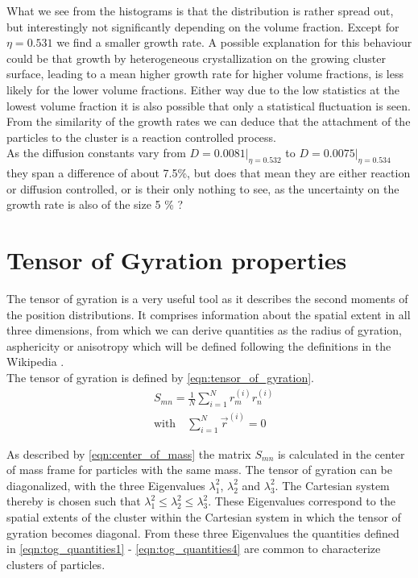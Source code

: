 What we see from the histograms is that the distribution is rather spread out, but interestingly not significantly depending on the volume fraction. Except for $\eta = 0.531$ we find a smaller growth rate. A possible explanation for this behaviour could be that growth by heterogeneous crystallization on the growing cluster surface, leading to a mean higher growth rate for higher volume fractions, is less likely for the lower volume fractions. Either way due to the low statistics at the lowest volume fraction it is also possible that only a statistical fluctuation is seen. From the similarity of the growth rates we can deduce that the attachment of the particles to the cluster is a reaction controlled process.  \\

As the diffusion constants vary from $D=0.0081|_{\eta = 0.532}$ to $D=0.0075|_{\eta = 0.534}$ they span a difference of about 7.5\%, but does that mean they are either reaction or diffusion controlled, or is their only nothing to see, as the uncertainty on the growth rate is also of the size 5 \% ?

\section{Tensor of Gyration properties}
\label{sec:tog}
The tensor of gyration is a very useful tool as it describes the second moments of the position distributions. It comprises information about the spatial extent in all three dimensions, from which we can derive quantities as the radius of gyration, asphericity or anisotropy which will be defined following the definitions in the Wikipedia .\\

The tensor of gyration is defined by \autoref{eqn:tensor_of_gyration}.
\begin{align}
\label{eqn:tensor_of_gyration}
&S_{mn}=\frac{1}{N} \sum_{i=1}^{N} r^{(i)}_m r^{(i)}_n\\
\label{eqn:center_of_mass}
&\text{with} \quad \sum_{i=1}^{N} \vec{r}^{(i)} = 0
\end{align}

As described by \autoref{eqn:center_of_mass} the matrix $S_{mn}$ is calculated in the center of mass frame for particles with the same mass. The tensor of gyration can be diagonalized, with the three Eigenvalues $\lambda_1^2$, $\lambda_2^2$ and $\lambda_3^2$. The Cartesian system thereby is chosen such that $\lambda_1^2 \leq \lambda_2^2 \leq \lambda_3^2 $. These Eigenvalues correspond to the spatial extents of the cluster within the Cartesian system in which the tensor of gyration becomes diagonal. From these three Eigenvalues the quantities defined in \autoref{eqn:tog_quantities1} - \ref{eqn:tog_quantities4} are common to characterize clusters of particles.

